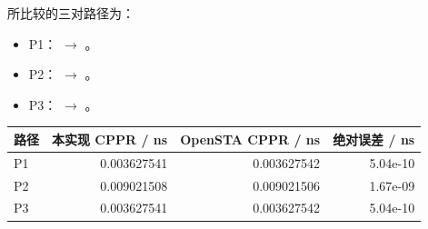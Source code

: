 所比较的三对路径为：
\begin{itemize}
\item P1： $\to$ 。
\item P2： $\to$ 。
\item P3： $\to$ 。
\end{itemize}
\begin{center}\small
\begin{tabular}{lrrr}
\toprule
路径 & 本实现 CPPR / ns & OpenSTA CPPR / ns & 绝对误差 / ns \\
\midrule
P1 & 0.003627541 & 0.003627542 & 5.04e-10 \\
P2 & 0.009021508 & 0.009021506 & 1.67e-09 \\
P3 & 0.003627541 & 0.003627542 & 5.04e-10 \\
\bottomrule
\end{tabular}
\end{center}
